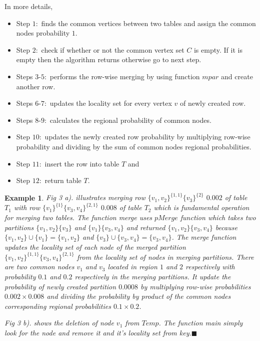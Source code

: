\documentclass[11pt]{article}
\newtheorem{exmp}{Example}[section]
\begin{document}
In more details, 
\begin{itemize}[noitemsep,nolistsep]
\item Step $1:$ finds the common vertices between two tables  and assign the common nodes probability $1$.
\item Step $2:$  check if whether or not the common vertex set $C$ is empty. If it is empty then the algorithm returns otherwise go to next step. 
\item Steps $3$-$5:$  performs the row-wise merging by using function $mpar$ and create another row.
\item  Steps $6$-$7:$ updates the locality set for every vertex $v$ of newly created row. 
\item Steps $8$-$9:$ calculates the regional probability of common nodes. 
\item Step $10:$ updates the newly created row probability by multiplying row-wise probability and dividing by the sum of common nodes regional probabilities. 
\item Step $11:$ insert the row into table $T$ and 
\item Step $12:$ return table $T$.
\end{itemize}
\begin{exmp}
\normalfont
Fig 3 a). illustrates merging row  $\{v_1,v_2\}^{\{1,1\}}\{v_3\}^{\{2\}}$ $0.002$ of table $T_1$ with row $\{v_1\}^{\{1\}}\{v_3,v_4\}^{\{2,1\}}$ $0.008$ of table $T_2$ which is fundamental operation for merging two tables. The function merge uses $pMerge$ function which takes two partitions $\{v_1,v_2\}\{v_3\}$ and $\{v_1\}\{v_3,v_4\}$ and returned $\{v_1,v_2\}\{v_3,v_4\}$ because $\{v_1,v_2\}\cup \{v_1\}=\{v_1,v_2\}$ and $\{v_3\}\cup \{v_3,v_4\}=\{v_3,v_4\}$. The merge function updates the locality set of each node of the merged partition $\{v_1,v_2\}^{\{1,1\}}\{v_3,v_4\}^{\{2,1\}}$ from the locality set of nodes in merging partitions. There are two common nodes $v_1$ and $v_3$ located in region $1$ and $2$ respectively with probability $0.1$ and $0.2$ respectively in the merging partitions. It update the probability of newly created partition $0.0008$ by multiplying row-wise probabilities $0.002\times 0.008$ and dividing the probability by product of the common nodes corresponding regional probabilities $0.1\times 0.2$.

Fig 3 b). shows the deletion of node $v_1$ from $Temp$. The function main simply look for the node and remove it and it's locality set from key.$\blacksquare$
\end{exmp}
\end{document}
